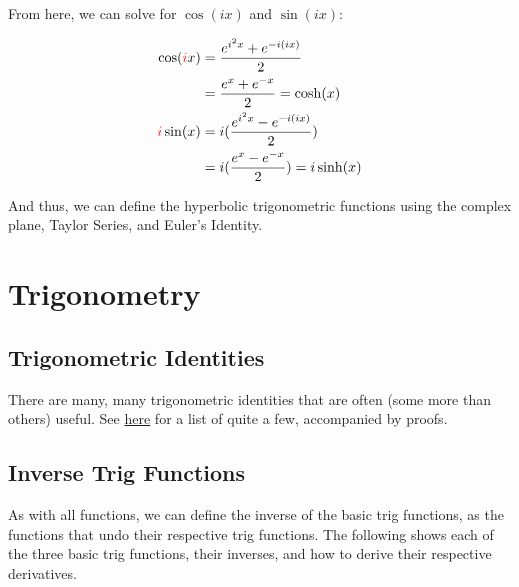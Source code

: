 \documentclass[12pt]{article}
\begin{document}
From here, we can solve for $\cos(ix)$ and $\sin(ix)$:


\begin{equation}
    \begin{split}
        \cos(\textcolor{red}{i}x) &= \frac{e^{i^2 x}+e^{-i(ix)}}{2}\\
        &= \frac{e^x+e^{-x}}{2} = \cosh(x)\\
        \textcolor{red}{i}\sin(x) &= i(\frac{e^{i^2 x}-e^{-i(ix)}}{2})\\
        &= i(\frac{e^x-e^{-x}}{2}) = i \sinh(x)\\
    \end{split}
\end{equation}

And thus, we can define the hyperbolic trigonometric functions using the complex plane, Taylor Series, and Euler's Identity. 

\newpage
\section{Trigonometry}
\subsection{Trigonometric Identities}
There are many, many trigonometric identities that are often (some more than others) useful. See \hyperlink{https://www.overleaf.com/project/633314fad7f84c6632a211a0}{here} for a list of quite a few, accompanied by proofs.
\subsection{Inverse Trig Functions}
As with all functions, we can define the inverse of the basic trig functions, as the functions that undo their respective trig functions. The following shows each of the three basic trig functions, their inverses, and how to derive their respective derivatives.
\end{document}
